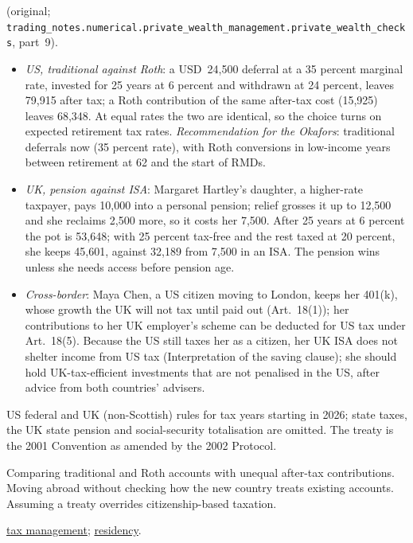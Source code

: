\begin{qfmethod}
 (original; \nolinkurl{trading_notes.numerical.private_wealth_management.private_wealth_checks}, part~9).
\begin{itemize}
\item \emph{US, traditional against Roth}: a USD~24,500 deferral at a 35 percent marginal rate, invested for 25 years at 6 percent and withdrawn at 24 percent, leaves 79,915 after tax; a Roth contribution of the same after-tax cost (15,925) leaves 68,348. At equal rates the two are identical, so the choice turns on expected retirement tax rates. \emph{Recommendation for the Okafors}: traditional deferrals now (35 percent rate), with Roth conversions in low-income years between retirement at 62 and the start of RMDs.
\item \emph{UK, pension against ISA}: Margaret Hartley's daughter, a higher-rate taxpayer, pays 10,000 into a personal pension; relief grosses it up to 12,500 and she reclaims 2,500 more, so it costs her 7,500. After 25 years at 6 percent the pot is 53,648; with 25 percent tax-free and the rest taxed at 20 percent, she keeps 45,601, against 32,189 from 7,500 in an ISA. The pension wins unless she needs access before pension age.
\item \emph{Cross-border}: Maya Chen, a US citizen moving to London, keeps her 401(k), whose growth the UK will not tax until paid out (Art.~18(1)); her contributions to her UK employer's scheme can be deducted for US tax under Art.~18(5). Because the US still taxes her as a citizen, her UK ISA does not shelter income from US tax (Interpretation of the saving clause); she should hold UK-tax-efficient investments that are not penalised in the US, after advice from both countries' advisers.
\end{itemize}

 US federal and UK (non-Scottish) rules for tax years starting in 2026; state taxes, the UK state pension and social-security totalisation are omitted. The treaty is the 2001 Convention as amended by the 2002 Protocol.

 Comparing traditional and Roth accounts with unequal after-tax contributions. Moving abroad without checking how the new country treats existing accounts. Assuming a treaty overrides citizenship-based taxation.

 \hyperref[meth:tax-in-planning]{tax management}; \hyperref[meth:residency-citizenship]{residency}.

\end{qfmethod}

